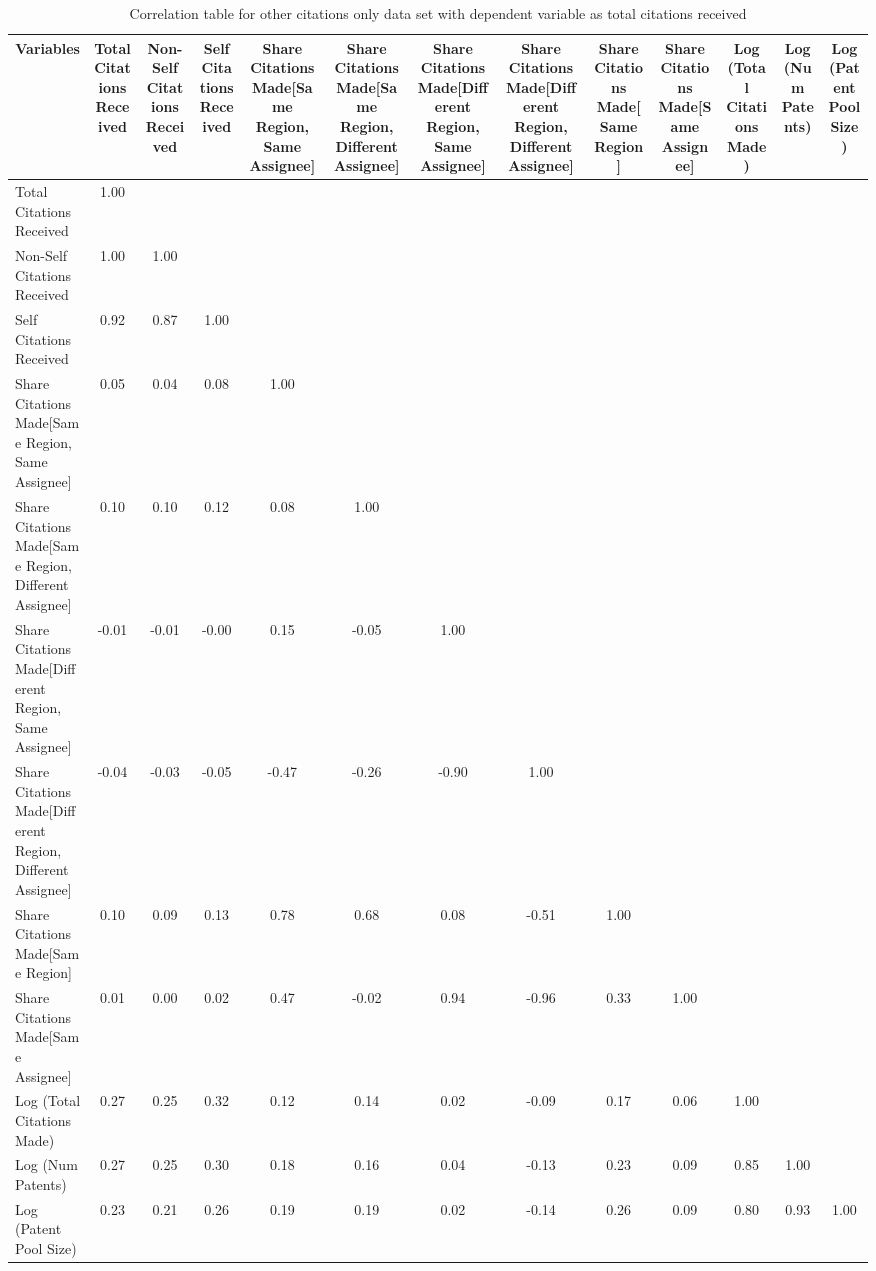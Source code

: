 \begin{table}[htbp]\centering \caption{Correlation table for other citations only data set with dependent variable as total citations received \label{o.tcorrelation}}
\begin{tabular}{l  c  c  c  c  c  c  c  c  c  c  c  c }\hline\hline
\multicolumn{1}{c}{Variables} &Total Citations Received&Non-Self Citations Received&Self Citations Received&Share Citations Made[Same Region, Same Assignee]&Share Citations Made[Same Region, Different Assignee]&Share Citations Made[Different Region, Same Assignee]&Share Citations Made[Different Region, Different Assignee]&Share Citations Made[Same Region]&Share Citations Made[Same Assignee]&Log (Total Citations Made)&Log (Num Patents)&Log (Patent Pool Size)\\ \hline
Total Citations Received&1.00\\
Non-Self Citations Received&1.00&1.00\\
Self Citations Received&0.92&0.87&1.00\\
Share Citations Made[Same Region, Same Assignee]&0.05&0.04&0.08&1.00\\
Share Citations Made[Same Region, Different Assignee]&0.10&0.10&0.12&0.08&1.00\\
Share Citations Made[Different Region, Same Assignee]&-0.01&-0.01&-0.00&0.15&-0.05&1.00\\
Share Citations Made[Different Region, Different Assignee]&-0.04&-0.03&-0.05&-0.47&-0.26&-0.90&1.00\\
Share Citations Made[Same Region]&0.10&0.09&0.13&0.78&0.68&0.08&-0.51&1.00\\
Share Citations Made[Same Assignee]&0.01&0.00&0.02&0.47&-0.02&0.94&-0.96&0.33&1.00\\
Log (Total Citations Made)&0.27&0.25&0.32&0.12&0.14&0.02&-0.09&0.17&0.06&1.00\\
Log (Num Patents)&0.27&0.25&0.30&0.18&0.16&0.04&-0.13&0.23&0.09&0.85&1.00\\
Log (Patent Pool Size)&0.23&0.21&0.26&0.19&0.19&0.02&-0.14&0.26&0.09&0.80&0.93&1.00\\
\hline \hline 
 \end{tabular}
\end{table}
